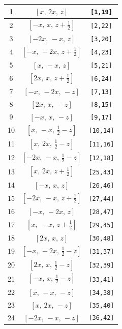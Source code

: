 \documentclass[fleqn,8pt]{jsarticle}
\begin{document}
\begin{longtable}{ccc}
1 & $\left[ x,\, 2 x,\, z \right]$ & {\tt [1,19]} \\ \hline
2 & $\left[ - x,\, x,\, z + \frac{1}{2} \right]$ & {\tt [2,22]} \\ \hline
3 & $\left[ - 2 x,\, - x,\, z \right]$ & {\tt [3,20]} \\ \hline
4 & $\left[ - x,\, - 2 x,\, z + \frac{1}{2} \right]$ & {\tt [4,23]} \\ \hline
5 & $\left[ x,\, - x,\, z \right]$ & {\tt [5,21]} \\ \hline
6 & $\left[ 2 x,\, x,\, z + \frac{1}{2} \right]$ & {\tt [6,24]} \\ \hline
7 & $\left[ - x,\, - 2 x,\, - z \right]$ & {\tt [7,13]} \\ \hline
8 & $\left[ 2 x,\, x,\, - z \right]$ & {\tt [8,15]} \\ \hline
9 & $\left[ - x,\, x,\, - z \right]$ & {\tt [9,17]} \\ \hline
10 & $\left[ x,\, - x,\, \frac{1}{2} - z \right]$ & {\tt [10,14]} \\ \hline
11 & $\left[ x,\, 2 x,\, \frac{1}{2} - z \right]$ & {\tt [11,16]} \\ \hline
12 & $\left[ - 2 x,\, - x,\, \frac{1}{2} - z \right]$ & {\tt [12,18]} \\ \hline
13 & $\left[ x,\, 2 x,\, z + \frac{1}{2} \right]$ & {\tt [25,43]} \\ \hline
14 & $\left[ - x,\, x,\, z \right]$ & {\tt [26,46]} \\ \hline
15 & $\left[ - 2 x,\, - x,\, z + \frac{1}{2} \right]$ & {\tt [27,44]} \\ \hline
16 & $\left[ - x,\, - 2 x,\, z \right]$ & {\tt [28,47]} \\ \hline
17 & $\left[ x,\, - x,\, z + \frac{1}{2} \right]$ & {\tt [29,45]} \\ \hline
18 & $\left[ 2 x,\, x,\, z \right]$ & {\tt [30,48]} \\ \hline
19 & $\left[ - x,\, - 2 x,\, \frac{1}{2} - z \right]$ & {\tt [31,37]} \\ \hline
20 & $\left[ 2 x,\, x,\, \frac{1}{2} - z \right]$ & {\tt [32,39]} \\ \hline
21 & $\left[ - x,\, x,\, \frac{1}{2} - z \right]$ & {\tt [33,41]} \\ \hline
22 & $\left[ x,\, - x,\, - z \right]$ & {\tt [34,38]} \\ \hline
23 & $\left[ x,\, 2 x,\, - z \right]$ & {\tt [35,40]} \\ \hline
24 & $\left[ - 2 x,\, - x,\, - z \right]$ & {\tt [36,42]} \\
\end{longtable}
\end{document}
